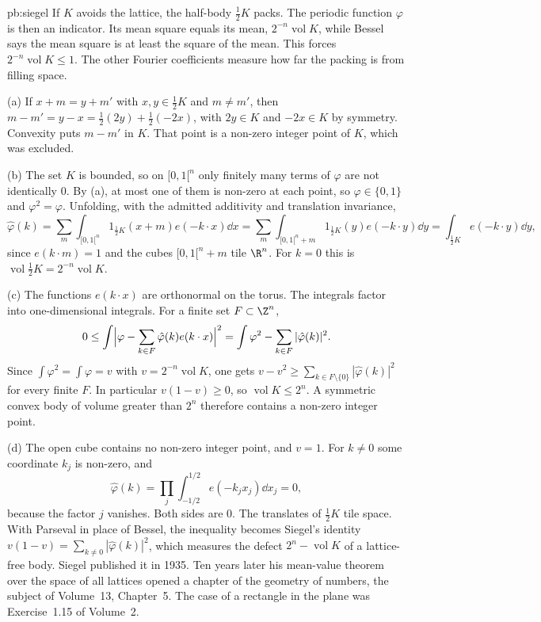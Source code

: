 \begin{solution}{pb:siegel}
\idea If $K$ avoids the lattice, the half-body $\frac12K$ packs. The periodic function $\varphi$ is then an indicator. Its mean square equals its mean, $2^{-n}\operatorname{vol}K$, while Bessel says the mean square is at least the square of the mean. This forces $2^{-n}\operatorname{vol}K\le1$. The other Fourier coefficients measure how far the packing is from filling space.

\writeup (a) If $x+m=y+m'$ with $x,y\in\frac12K$ and $m\ne m'$, then $m-m'=y-x=\frac12(2y)+\frac12(-2x)$, with $2y\in K$ and $-2x\in K$ by symmetry. Convexity puts $m-m'$ in $K$. That point is a non-zero integer point of $K$, which was excluded.

(b) The set $K$ is bounded, so on $[0,1[^n$ only finitely many terms of $\varphi$ are not identically $0$. By (a), at most one of them is non-zero at each point, so $\varphi\in\{0,1\}$ and $\varphi^2=\varphi$. Unfolding, with the admitted additivity and translation invariance,
\[
\hat\varphi(k)=\sum_m\int_{[0,1[^n}1_{\frac12K}(x+m)e(-k\cdot x)\dd x=\sum_m\int_{[0,1[^n+m}1_{\frac12K}(y)e(-k\cdot y)\dd y=\int_{\frac12K}e(-k\cdot y)\dd y,
\]
since $e(k\cdot m)=1$ and the cubes $[0,1[^n+m$ tile $\R^n$. For $k=0$ this is $\operatorname{vol}\frac12K=2^{-n}\operatorname{vol}K$.

(c) The functions $e(k\cdot x)$ are orthonormal on the torus. The integrals factor into one-dimensional integrals. For a finite set $F\subset\Z^n$,
\[
0\le\int\Bigl|\varphi-\sum_{k\in F}\hat\varphi(k)e(k\cdot x)\Bigr|^2=\int\varphi^2-\sum_{k\in F}|\hat\varphi(k)|^2.
\]
Since $\int\varphi^2=\int\varphi=v$ with $v=2^{-n}\operatorname{vol}K$, one gets $v-v^2\ge\sum_{k\in F\setminus\{0\}}|\hat\varphi(k)|^2$ for every finite $F$. In particular $v(1-v)\ge0$, so $\operatorname{vol}K\le2^n$. A symmetric convex body of volume greater than $2^n$ therefore contains a non-zero integer point.

(d) The open cube contains no non-zero integer point, and $v=1$. For $k\ne0$ some coordinate $k_j$ is non-zero, and
\[
\hat\varphi(k)=\prod_j\int_{-1/2}^{1/2}e(-k_jx_j)\dd x_j=0,
\]
because the factor $j$ vanishes. Both sides are $0$. The translates of $\frac12K$ tile space.
\leads With Parseval in place of Bessel, the inequality becomes Siegel's identity $v(1-v)=\sum_{k\ne0}|\hat\varphi(k)|^2$, which measures the defect $2^n-\operatorname{vol}K$ of a lattice-free body. Siegel published it in 1935. Ten years later his mean-value theorem over the space of all lattices opened a chapter of the geometry of numbers, the subject of Volume~13, Chapter~5. The case of a rectangle in the plane was Exercise~1.15 of Volume~2.
\end{solution}

